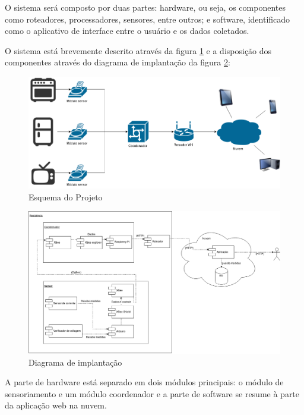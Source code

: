 \label{Cap:especificacao}

O sistema será composto por duas partes: hardware, ou seja, os componentes como roteadores, processadores, sensores, entre outros; e software, identificado como o aplicativo de interface entre o usuário e os dados coletados.

O sistema está brevemente descrito através da figura \ref{fig:esqueminha} e a disposição dos componentes através do diagrama de implantação da figura \ref{fig:diagrama_implantacao}:

\begin{figure}
\centering
\includegraphics[width=1\textwidth]{figuras/esqueminha.png}
\caption{\label{fig:esqueminha} Esquema do Projeto}
\end{figure}

\begin{figure}
\centering
\includegraphics[width=1\textwidth]{figuras/diagrama_implantacao.png}
\caption{\label{fig:diagrama_implantacao} Diagrama de implantação}
\end{figure}

A parte de hardware está separado em dois módulos principais: o módulo de sensoriamento e um módulo coordenador e a parte de software se resume à parte da aplicação web na nuvem.


\cleardoublepage

